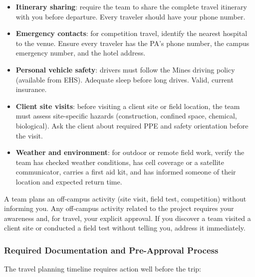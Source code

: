 \begin{itemize}[nosep,leftmargin=1.5em]
\item \textbf{Itinerary sharing}: require the team to share the complete travel itinerary with you before departure. Every traveler should have your phone number.
\item \textbf{Emergency contacts}: for competition travel, identify the nearest hospital to the venue. Ensure every traveler has the PA's phone number, the campus emergency number, and the hotel address.
\item \textbf{Personal vehicle safety}: drivers must follow the Mines driving policy (available from EHS). Adequate sleep before long drives. Valid, current insurance.
\item \textbf{Client site visits}: before visiting a client site or field location, the team must assess site-specific hazards (construction, confined space, chemical, biological). Ask the client about required PPE and safety orientation before the visit.
\item \textbf{Weather and environment}: for outdoor or remote field work, verify the team has checked weather conditions, has cell coverage or a satellite communicator, carries a first aid kit, and has informed someone of their location and expected return time.
\end{itemize}

\begin{redflag}
A team plans an off-campus activity (site visit, field test, competition) without informing you. Any off-campus activity related to the project requires your awareness and, for travel, your explicit approval. If you discover a team visited a client site or conducted a field test without telling you, address it immediately.
\end{redflag}

\subsubsection{Required Documentation and Pre-Approval Process}

The travel planning timeline requires action well before the trip:

